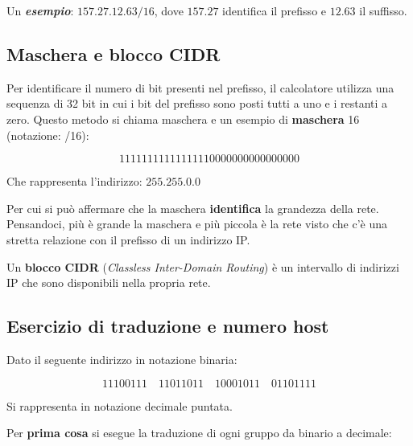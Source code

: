 \documentclass[a4paper]{article}
\begin{document}
	\noindent
	Un \textbf{\emph{esempio}}: $157.27.12.63/16$, dove $157.27$ identifica il prefisso e $12.63$ il suffisso.
	
	\subsection{Maschera e blocco CIDR}
	
	Per identificare il numero di bit presenti nel prefisso, il calcolatore utilizza una sequenza di 32 bit in cui i bit del prefisso sono posti tutti a uno e i restanti a zero. Questo metodo si chiama maschera e un esempio di \textcolor{Red3}{\textbf{maschera}} 16 (notazione: /16):
	
	\begin{equation*}
		11111111111111110000000000000000
	\end{equation*}

	\noindent
	Che rappresenta l'indirizzo: $255.255.0.0$\newline
	
	\noindent
	Per cui si può affermare che la maschera \textbf{identifica} la grandezza della rete. Pensandoci, più è grande la maschera e più piccola è la rete visto che c’è una stretta relazione con il prefisso di un indirizzo IP.\newline
	
	\noindent
	Un \textcolor{Red3}{\textbf{blocco CIDR}} (\emph{Classless Inter-Domain Routing}) è un intervallo di indirizzi IP che sono disponibili nella propria rete.
	
	\newpage
	
	\subsection{\textcolor{Red3}{Esercizio di traduzione e numero host}}
	
	Dato il seguente indirizzo in notazione binaria:
	
	\begin{equation*}
		11100111 \hspace{1em} 11011011 \hspace{1em} 10001011 \hspace{1em} 01101111
	\end{equation*}

	\noindent
	Si rappresenta in notazione decimale puntata.\newline
	
	\noindent
	Per \textbf{prima cosa} si esegue la traduzione di ogni gruppo da binario a decimale:
	
\end{document}
